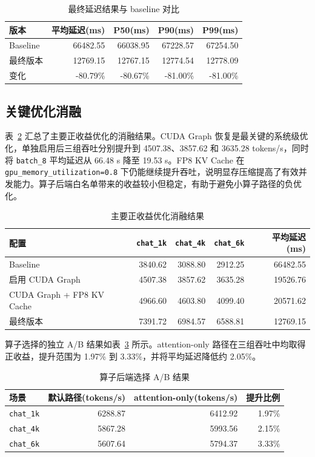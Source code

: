 \documentclass[UTF8,10.5pt]{ctexart}
\newcommand{\code}[1]{\texttt{#1}}
\begin{document}
\begin{table}[H]
\centering
\caption{最终延迟结果与 baseline 对比}
\label{tab:final-latency}
\begin{tabular}{lrrrr}
\toprule
版本 & 平均延迟(ms) & P50(ms) & P90(ms) & P99(ms) \\
\midrule
Baseline & 66482.55 & 66038.95 & 67228.57 & 67254.50 \\
最终版本 & 12769.15 & 12767.15 & 12774.54 & 12778.09 \\
变化 & -80.79\% & -80.67\% & -81.00\% & -81.00\% \\
\bottomrule
\end{tabular}
\end{table}

\subsection{关键优化消融}

表~\ref{tab:ablation-positive} 汇总了主要正收益优化的消融结果。CUDA Graph 恢复是最关键的系统级优化，单独启用后三组吞吐分别提升到 4507.38、3857.62 和 3635.28 tokens/s，同时将 \code{batch\_8} 平均延迟从 66.48 s 降至 19.53 s。FP8 KV Cache 在 \code{gpu\_memory\_utilization=0.8} 下仍能继续提升吞吐，说明显存压缩提高了有效并发能力。算子后端白名单带来的收益较小但稳定，有助于避免小算子路径的负优化。

\begin{table}[H]
\centering
\caption{主要正收益优化消融结果}
\label{tab:ablation-positive}
\begin{tabular}{lrrrr}
\toprule
配置 & \code{chat\_1k} & \code{chat\_4k} & \code{chat\_6k} & 平均延迟(ms) \\
\midrule
Baseline & 3840.62 & 3088.80 & 2912.25 & 66482.55 \\
启用 CUDA Graph & 4507.38 & 3857.62 & 3635.28 & 19526.76 \\
CUDA Graph + FP8 KV Cache & 4966.60 & 4603.80 & 4099.40 & 20571.62 \\
最终版本 & 7391.72 & 6984.57 & 6588.81 & 12769.15 \\
\bottomrule
\end{tabular}
\end{table}

算子选择的独立 A/B 结果如表~\ref{tab:operator-ablation} 所示。attention-only 路径在三组吞吐中均取得正收益，提升范围为 1.97\% 到 3.33\%，并将平均延迟降低约 2.05\%。

\begin{table}[H]
\centering
\caption{算子后端选择 A/B 结果}
\label{tab:operator-ablation}
\begin{tabular}{lrrr}
\toprule
场景 & 默认路径(tokens/s) & attention-only(tokens/s) & 提升比例 \\
\midrule
\code{chat\_1k} & 6288.87 & 6412.92 & 1.97\% \\
\code{chat\_4k} & 5867.28 & 5993.56 & 2.15\% \\
\code{chat\_6k} & 5607.64 & 5794.37 & 3.33\% \\
\bottomrule
\end{tabular}
\end{table}
\end{document}
